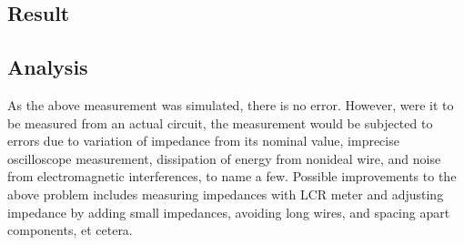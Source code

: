 \documentclass{article}
\begin{document}
\subsection*{Result}
\begin{table}[H]
    \centering
\end{table}
\begin{table}[H]
    \centering
\end{table}
\subsection*{Analysis}
As the above measurement was simulated, there is no error. However, were it to be measured from an actual circuit, the measurement would be subjected to errors due to variation of impedance from its nominal value, imprecise oscilloscope measurement, dissipation of energy from nonideal wire, and noise from electromagnetic interferences, to name a few. Possible improvements to the above problem includes measuring impedances with LCR meter and adjusting impedance by adding small impedances, avoiding long wires, and spacing apart components, et cetera.

\newpage
\end{document}
